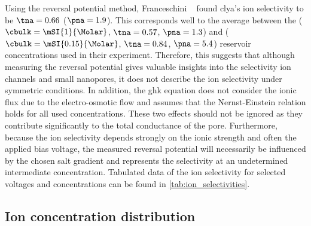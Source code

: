 Using the reversal potential method, Franceschini \etal{}~\cite{Franceschini-2016} found \gls{clya}'s ion
selectivity to be $\tna=0.66$ ($\pna=1.9$). This corresponds well to the average between the \cisi{}
($\cbulk=\mSI{1}{\Molar}$, $\tna=0.57$, $\pna=1.3$) and \transi{} ($\cbulk=\mSI{0.15}{\Molar}$, $\tna=0.84$,
$\pna=5.4$) reservoir concentrations used in their experiment. Therefore, this suggests that although
measuring the reversal potential gives valuable insights into the selectivity ion channels and small
nanopores, it does not describe the ion selectivity under symmetric conditions. In addition, the \gls{ghk}
equation does not consider the ionic flux due to the electro-osmotic flow and assumes that the Nernst-Einstein
relation holds for all used concentrations. These two effects should not be ignored as they contribute
significantly to the total conductance of the pore. Furthermore, because the ion selectivity depends strongly
on the ionic strength and often the applied bias voltage, the measured reversal potential will necessarily be
influenced by the chosen salt gradient and represents the selectivity at an undetermined intermediate
concentration. Tabulated data of the ion selectivity for selected voltages and concentrations can be found in
\cref{tab:ion_selectivities}.


\subsection{Ion concentration distribution}\label{sec:ionc}
%

